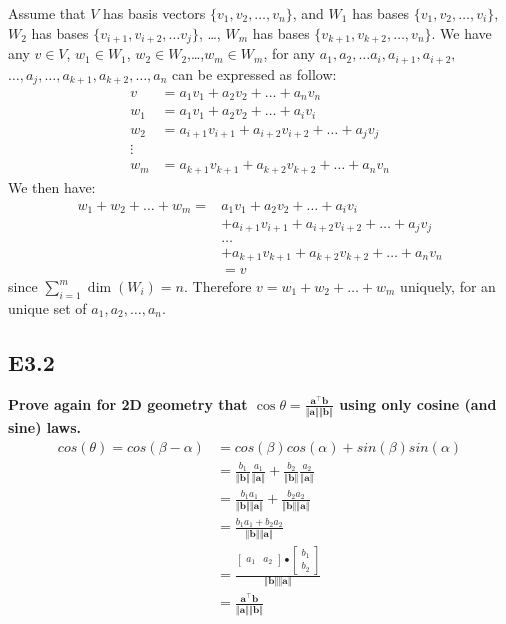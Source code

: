 \documentclass[12pt]{article}
\begin{document}
Assume that $V$ has basis vectors $\{v_1,v_2,\ldots , v_n\}$, and $W_1$ has bases $\{ v_1,v_2,\ldots, v_i\}$, $W_2$ has bases $\{v_{i+1}, v_{i+2},\ldots v_j\}$, \ldots , $W_m$ has bases $\{v_{k+1}, v_{k+2},\ldots , v_n \}$. We have any $v \in V$, $w_1 \in W_1$, $w_2\in W_2$,\ldots ,$w_m \in W_m$, for any $a_1,a_2,\ldots a_i, a_{i+1}, a_{i+2},$ $\ldots ,a_j,\ldots , a_{k+1}, a_{k+2}, \ldots ,a_n$ can be expressed as follow:
\begin{align*}
v &= a_1v_1 + a_2v_2 + \ldots + a_nv_n\\
w_1 &= a_1v_1 + a_2v_2 +\ldots +a_iv_i\\
w_2 &= a_{i+1}v_{i+1} + a_{i+2}v_{i+2} +\ldots + a_jv_j\\
\vdots\\
w_m &= a_{k+1}v_{k+1} + a_{k+2}v_{k+2}+\ldots + a_{n}v_{n}
\end{align*}
We then have:
\begin{align*}
w_1+w_2+\ldots+w_m = &a_1v_1 + a_2v_2 +\ldots +a_iv_i \\
&+a_{i+1}v_{i+1} + a_{i+2}v_{i+2} +\ldots + a_jv_j\\
&\ldots\\
&+a_{k+1}v_{k+1} + a_{k+2}v_{k+2}+\ldots + a_{n}v_{n}\\
&= v
\end{align*}
since $\sum_{i=1}^{m} \dim(W_i) = n$. Therefore $v = w_1+w_2+\ldots+w_m$ uniquely, for an unique set of $a_1, a_2,\ldots, a_n$.



\subsection*{E3.2}
\textbf{Prove again for 2D geometry that $\cos\theta =\frac{\mathbf a^\top\mathbf b}{\Vert \mathbf a\Vert \Vert \mathbf b\Vert}$ using only cosine (and sine) laws.}
\begin{align*}
cos(\theta) = cos(\beta - \alpha) &=cos(\beta)cos(\alpha)+sin(\beta)sin(\alpha)\\
&= \frac{b_1}{\Vert \mathbf b \Vert}\frac{a_1}{\Vert\mathbf a \Vert} + \frac{b_2}{\Vert\mathbf b \Vert}\frac{a_2}{\Vert\mathbf a \Vert} \\
&= \frac{b_1a_1}{\Vert\mathbf b\Vert \Vert\mathbf a\Vert} +\frac{b_2a_2}{\Vert\mathbf b\Vert \Vert\mathbf a\Vert}\\
&= \frac{b_1a_1+b_2a_2}{\Vert\mathbf b\Vert \Vert\mathbf a \Vert}\\
&= \frac{\begin{bmatrix}
a_1 & a_2
\end{bmatrix}•
\begin{bmatrix}
b_1\\
b_2
\end{bmatrix}}
{\Vert\mathbf b\Vert \Vert\mathbf a \Vert}\\
&= \frac{\mathbf a^\top\mathbf b}{\Vert \mathbf a\Vert \Vert \mathbf b\Vert}
\end{align*}
\end{document}
